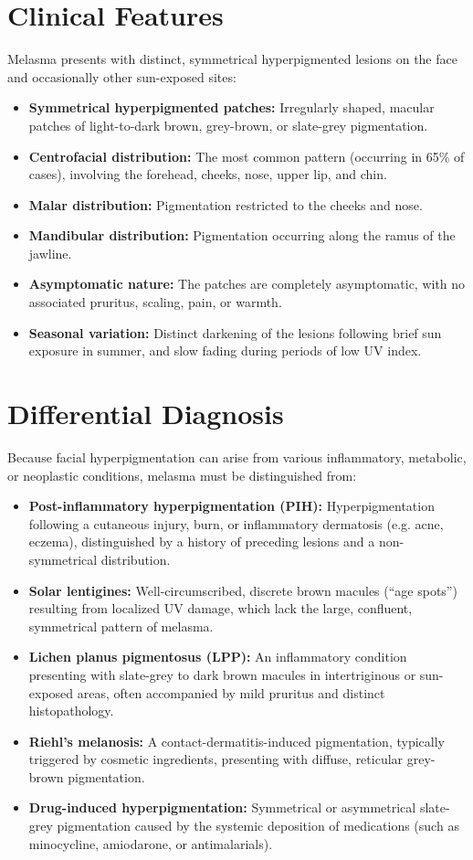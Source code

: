 \section*{Clinical Features}
Melasma presents with distinct, symmetrical hyperpigmented lesions on the face and occasionally other sun-exposed sites:
\begin{itemize}
    \item \textbf{Symmetrical hyperpigmented patches:} Irregularly shaped, macular patches of light-to-dark brown, grey-brown, or slate-grey pigmentation.
    \item \textbf{Centrofacial distribution:} The most common pattern (occurring in 65\% of cases), involving the forehead, cheeks, nose, upper lip, and chin.
    \item \textbf{Malar distribution:} Pigmentation restricted to the cheeks and nose.
    \item \textbf{Mandibular distribution:} Pigmentation occurring along the ramus of the jawline.
    \item \textbf{Asymptomatic nature:} The patches are completely asymptomatic, with no associated pruritus, scaling, pain, or warmth.
    \item \textbf{Seasonal variation:} Distinct darkening of the lesions following brief sun exposure in summer, and slow fading during periods of low UV index.
\end{itemize}

\section*{Differential Diagnosis}
Because facial hyperpigmentation can arise from various inflammatory, metabolic, or neoplastic conditions, melasma must be distinguished from:
\begin{itemize}
    \item \textbf{Post-inflammatory hyperpigmentation (PIH):} Hyperpigmentation following a cutaneous injury, burn, or inflammatory dermatosis (e.g. acne, eczema), distinguished by a history of preceding lesions and a non-symmetrical distribution.
    \item \textbf{Solar lentigines:} Well-circumscribed, discrete brown macules (``age spots'') resulting from localized UV damage, which lack the large, confluent, symmetrical pattern of melasma.
    \item \textbf{Lichen planus pigmentosus (LPP):} An inflammatory condition presenting with slate-grey to dark brown macules in intertriginous or sun-exposed areas, often accompanied by mild pruritus and distinct histopathology.
    \item \textbf{Riehl's melanosis:} A contact-dermatitis-induced pigmentation, typically triggered by cosmetic ingredients, presenting with diffuse, reticular grey-brown pigmentation.
    \item \textbf{Drug-induced hyperpigmentation:} Symmetrical or asymmetrical slate-grey pigmentation caused by the systemic deposition of medications (such as minocycline, amiodarone, or antimalarials).
\end{itemize}

